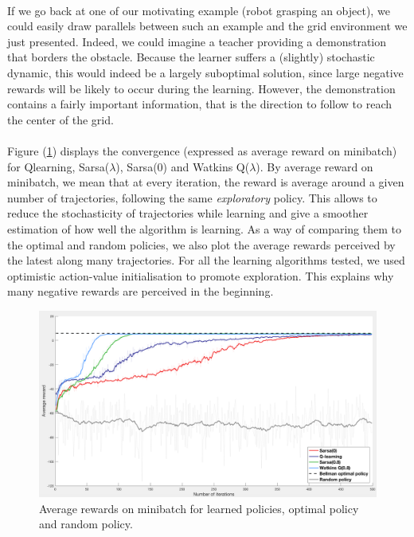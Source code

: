 \documentclass[a4paper]{report}
\begin{document}
{{			\paragraph{} If we go back at one of our motivating example (robot grasping an object), we could easily draw parallels between such an example and the grid environment we just presented. Indeed, we could imagine a teacher providing a demonstration that borders the obstacle. Because the learner suffers a (slightly) stochastic dynamic, this would indeed be a largely suboptimal solution, since large negative rewards will be likely to occur during the learning. However, the demonstration contains a fairly important information, that is the direction to follow to reach the center of the grid. 
						
			\paragraph{} Figure (\ref{fig::comp_maze}) displays the convergence (expressed as average reward on minibatch) for Qlearning, Sarsa($\lambda$), Sarsa(0) and Watkins Q($\lambda$). By average reward on minibatch, we mean that at every iteration, the reward is average around a given number of trajectories, following the same \emph{exploratory} policy. This allows to reduce the stochasticity of trajectories while learning and give a smoother estimation of how well the algorithm is learning. As a way of comparing them to the optimal and random policies, we also plot the average rewards perceived by the latest along many trajectories. \newline
For all the learning algorithms tested, we used optimistic action-value initialisation to promote exploration. This explains why many negative rewards are perceived in the beginning. 
				
			\begin{figure}
				\begin{center}
					\includegraphics[width=\linewidth]{comp_maze}
					\caption{Average rewards on minibatch for learned policies, optimal policy and random policy.}
					\label{fig::comp_maze}
				\end{center}
			\end{figure}
		}
}
\end{document}
